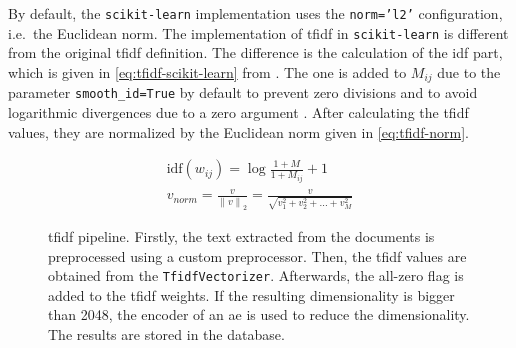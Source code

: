 By default, the \texttt{scikit-learn} implementation uses the \texttt{norm='l2'} configuration, i.e.\ the Euclidean norm.
The implementation of \ac{tfidf} in \texttt{scikit-learn} is different from the original \ac{tfidf} definition.
The difference is the calculation of the \ac{idf} part, which is given in \autoref{eq:tfidf-scikit-learn} from \cite{tfidf-scikit-learn}.
The one is added to $M_{ij}$ due to the parameter \texttt{smooth\_id=True} by default to prevent zero divisions 
and to avoid logarithmic divergences due to a zero argument \cite{glove2014}.
After calculating the \ac{tfidf} values, they are normalized by the Euclidean norm given in \autoref{eq:tfidf-norm}.

\begin{align}
    \text{idf}(w_{ij}) = \log \frac{1 + M}{1 + M_{ij}} + 1\label{eq:tfidf-scikit-learn}\\
    v_{norm} = \frac{v}{\left\| v \right\|_{2}} = \frac{v}{\sqrt{v_1^{2} + v_2^{2} + ... + v_M^{2}}}\label{eq:tfidf-norm}
\end{align}

\begin{figure}[!htp] %
    \centering
    
    \caption[\acs*{tfidf} pipeline]{\acs*{tfidf} pipeline.
    Firstly, the text extracted from the documents is preprocessed using a custom preprocessor.
    Then, the \acs*{tfidf} values are obtained from the \texttt{TfidfVectorizer}.
    Afterwards, the all-zero flag is added to the \acs*{tfidf} weights.
    If the resulting dimensionality is bigger than 2048, the encoder of an \acs*{ae} is used to reduce the dimensionality.
    The results are stored in the database.
    }
    \label{fig:tfidf_embedding}
\end{figure}


